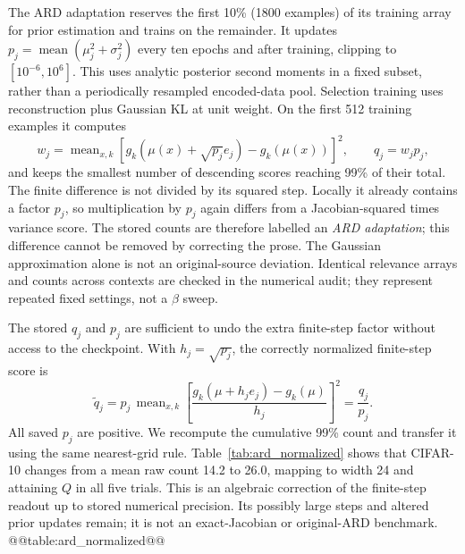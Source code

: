 The ARD adaptation reserves the first 10\% (1800 examples) of its
training array for prior estimation and trains on the remainder.
It updates $p_j=\operatorname{mean}(\mu_j^2+\sigma_j^2)$ every ten
epochs and after training, clipping to $[10^{-6},10^6]$.
This uses analytic posterior second moments in a fixed subset, rather
than a periodically resampled encoded-data pool. Selection training uses
reconstruction plus Gaussian KL at unit weight. On the first 512
training examples it computes
\begin{equation}
 w_j=\operatorname{mean}_{x,k}
 [g_k(\mu(x)+\sqrt{p_j}e_j)-g_k(\mu(x))]^2,
 \qquad q_j=w_jp_j,
 \label{eq:ardlocal}
\end{equation}
and keeps the smallest number of descending scores reaching 99\% of
their total. The finite difference is not divided by its squared step.
Locally it already contains a factor $p_j$, so multiplication by $p_j$
again differs from a Jacobian-squared times variance score. The stored
counts are therefore labelled an \emph{ARD adaptation}; this difference
cannot be removed by correcting the prose. The Gaussian approximation
alone is not an original-source deviation. Identical relevance arrays
and counts across contexts are checked in the numerical audit; they
represent repeated fixed settings, not a $\beta$ sweep.

The stored $q_j$ and $p_j$ are sufficient to undo the extra finite-step
factor without access to the checkpoint. With $h_j=\sqrt{p_j}$, the
correctly normalized finite-step score is
\begin{equation}
 \widetilde q_j
 =p_j\,\operatorname{mean}_{x,k}
 \left[\frac{g_k(\mu+h_je_j)-g_k(\mu)}{h_j}\right]^2
 =\frac{q_j}{p_j}.
 \label{eq:ardcorrected}
\end{equation}
All saved $p_j$ are positive. We recompute the cumulative 99\% count
and transfer it using the same nearest-grid rule. Table~\ref{tab:ard_normalized}
shows that CIFAR-10 changes from a mean raw count 14.2 to 26.0,
mapping to width 24 and attaining $Q$ in all five trials. This is an
algebraic correction of the finite-step readout up to stored numerical
precision. Its
possibly large steps and altered prior updates remain; it is not
an exact-Jacobian or original-ARD benchmark.
@@table:ard_normalized@@

